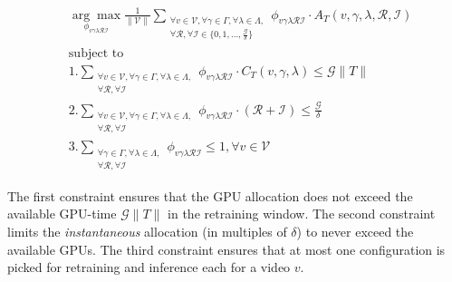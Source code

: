 {\small
\vspace{-12pt}
\begin{equation}
    \begin{aligned}
       & \underset{\phi_{v\gamma\lambda\mathcal{R}\mathcal{I}}}{\arg\max}
         \frac{1}{\lVert \mathcal{V} \rVert}
         \sum_{\substack{\forall v\in\mathcal{V}, 
                        \forall \gamma\in\Gamma,
                        \forall \lambda\in\Lambda,\\
                        \forall \mathcal{R}, \forall \mathcal{I} \in \{0, 1, ..., \frac{\mathcal{G}}{\delta}\} %
                        }}
          \phi_{v\gamma\lambda\mathcal{R}\mathcal{I}} \cdot
          A_T(v, \gamma, \lambda, \mathcal{R}, \mathcal{I})\\
       & \text{subject to}\\
       & 1. \sum_{\substack{\forall v\in\mathcal{V}, 
                        \forall \gamma\in\Gamma,
                        \forall \lambda\in\Lambda,\\
                        \forall \mathcal{R}, \forall \mathcal{I}}}
                        \phi_{v\gamma\lambda\mathcal{R}\mathcal{I}} \cdot
                        C_T(v, \gamma, \lambda)
                        \leq \mathcal{G}\lVert T \rVert \\
      & 2. \sum_{\substack{\forall v\in\mathcal{V},
                        \forall \gamma\in\Gamma,
                        \forall \lambda\in\Lambda,\\
                        \forall \mathcal{R}, \forall \mathcal{I}}}
                           \phi_{v\gamma\lambda\mathcal{R}\mathcal{I}} \cdot
                           (\mathcal{R} + \mathcal{I})
                        \leq \frac{\mathcal{G}}{\delta} \\
      & 3. \sum_{\substack{\forall \gamma\in\Gamma, 
                           \forall \lambda\in\Lambda,\\ 
                           \forall \mathcal{R}, %
                           \forall \mathcal{I}}} %
           \phi_{v\gamma\lambda\mathcal{R}\mathcal{I}} \leq 1, 
           \forall v\in\mathcal{V}
    \end{aligned}
    \label{eqn:optimization}
\end{equation}
}%

The first constraint ensures that the GPU allocation does not exceed the available GPU-time $\mathcal{G}\lVert T \rVert$ in the retraining window. The second constraint limits the {\em instantaneous}  allocation (in multiples of $\delta$) to never exceed the available GPUs. 
The third constraint ensures that at most one configuration is picked for retraining and inference each for a video $v$.

